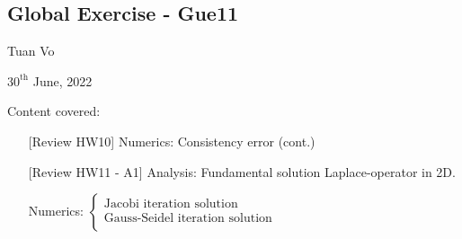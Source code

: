 \documentclass[12pt]{article}
\begin{document}
\begin{center}
	\section*{Global Exercise - Gue11}
\end{center}
\begin{center}
	Tuan Vo
\end{center}
\begin{center}
	$30^{\text{th}}$ June, 2022
\end{center}
Content covered:
\begin{itemize}
	\item[\checkmark] [Review HW10] Numerics: Consistency error (cont.)
	\item[\checkmark] [Review HW11 - A1] Analysis: Fundamental solution Laplace-operator in 2D.
	\item[\checkmark] Numerics:
	      $
		      \begin{cases}
			      \text{Jacobi iteration solution		}       \\
			      \text{Gauss-Seidel iteration solution		} \\
		      \end{cases}
	      $
\end{itemize}

\end{document}

